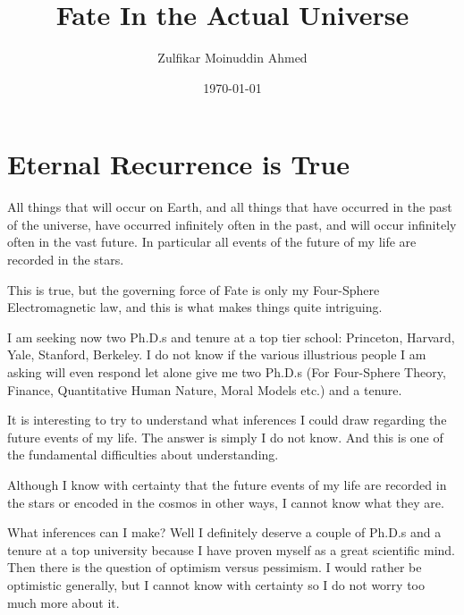 \documentclass{amsart}
\title{Fate In the Actual Universe}
\author{Zulfikar Moinuddin Ahmed}
\date{\today}
\begin{document}
\maketitle

\section{Eternal Recurrence is True}

All things that will occur on Earth, and all things that have occurred in the past of the universe, have occurred infinitely often in the past, and will occur infinitely often in the vast future.   In particular all events of the future of my life are recorded in the stars.  

This is true, but the governing force of Fate is only my Four-Sphere Electromagnetic law, and this is what makes things quite intriguing.

I am seeking now two Ph.D.s and tenure at a top tier school: Princeton, Harvard, Yale, Stanford, Berkeley.  I do not know if the various illustrious people I am asking will even respond let alone give me two Ph.D.s (For Four-Sphere Theory, Finance, Quantitative Human Nature, Moral Models etc.) and a tenure.

It is interesting to try to understand what inferences I could draw regarding the future events of my life.  The answer is simply I do not know.  And this is one of the fundamental difficulties about understanding.

Although I know with certainty that the future events of my life are recorded in the stars or encoded in the cosmos in other ways, I cannot know what they are.

What inferences can I make?  Well I definitely deserve a couple of Ph.D.s and a tenure at a top university because I have proven myself as a great scientific mind.  Then there is the question of optimism versus pessimism.  I would rather be optimistic generally, but I cannot know with certainty so I do not worry too much more about it.
\end{document}
